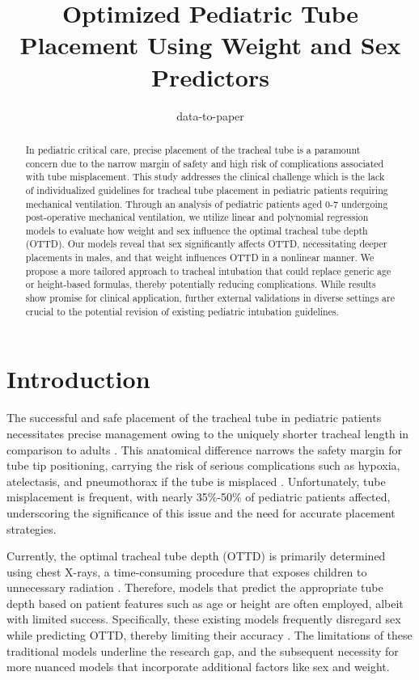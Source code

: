 \documentclass[11pt]{article}
\title{Optimized Pediatric Tube Placement Using Weight and Sex Predictors}
\author{data-to-paper}
\begin{document}
\maketitle
\begin{abstract}
In pediatric critical care, precise placement of the tracheal tube is a paramount concern due to the narrow margin of safety and high risk of complications associated with tube misplacement. This study addresses the clinical challenge which is the lack of individualized guidelines for tracheal tube placement in pediatric patients requiring mechanical ventilation. Through an analysis of pediatric patients aged 0-7 undergoing post-operative mechanical ventilation, we utilize linear and polynomial regression models to evaluate how weight and sex influence the optimal tracheal tube depth (OTTD). Our models reveal that sex significantly affects OTTD, necessitating deeper placements in males, and that weight influences OTTD in a nonlinear manner. We propose a more tailored approach to tracheal intubation that could replace generic age or height-based formulas, thereby potentially reducing complications. While results show promise for clinical application, further external validations in diverse settings are crucial to the potential revision of existing pediatric intubation guidelines.
\end{abstract}
\section*{Introduction}

The successful and safe placement of the tracheal tube in pediatric patients necessitates precise management owing to the uniquely shorter tracheal length in comparison to adults \cite{Wolfler2011DailyPO}. This anatomical difference narrows the safety margin for tube tip positioning, carrying the risk of serious complications such as hypoxia, atelectasis, and pneumothorax if the tube is misplaced \cite{Foronda2011TheIO, Weiss2005AppropriatePO}. Unfortunately, tube misplacement is frequent, with nearly 35\%-50\% of pediatric patients affected, underscoring the significance of this issue and the need for accurate placement strategies.

Currently, the optimal tracheal tube depth (OTTD) is primarily determined using chest X-rays, a time-consuming procedure that exposes children to unnecessary radiation \cite{Jagannathan2011ACE}. Therefore, models that predict the appropriate tube depth based on patient features such as age or height are often employed, albeit with limited success. Specifically, these existing models frequently disregard sex while predicting OTTD, thereby limiting their accuracy \cite{Marciniak2009AirwayMI, Bond2019ACE}. The limitations of these traditional models underline the research gap, and the subsequent necessity for more nuanced models that incorporate additional factors like sex and weight.
\end{document}
